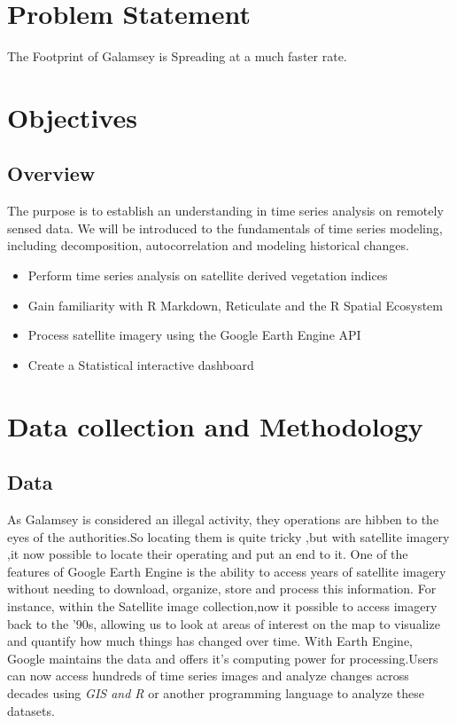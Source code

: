 \documentclass[12pt,a4paper]{article}
\begin{document}
	\section{Problem Statement}
	The Footprint of Galamsey is Spreading at a much faster rate.
	\section{Objectives}
	\subsection{Overview}
	The purpose  is to establish an understanding in time series analysis on remotely sensed data. We will be introduced to the fundamentals of time series modeling, including decomposition, autocorrelation and modeling historical changes.\\
    \begin{itemize}
    \item  Perform time series analysis on satellite derived vegetation indices\\
	\item Gain familiarity with R Markdown, Reticulate and the R Spatial Ecosystem\\
	\item  Process satellite imagery using the Google Earth Engine API\\
	\item  Create a Statistical  interactive dashboard\
    \end{itemize}
	

	\section{Data collection and Methodology}
	 \subsection{Data}As Galamsey is considered an illegal activity, they operations are hibben to the eyes of the authorities.So locating them is quite tricky ,but with satellite imagery ,it now possible to locate their operating and put an end to it. One of the  features of Google Earth Engine is the ability to access years of  satellite imagery without  needing to download, organize, store and process this information. For instance, within the Satellite  image collection,now it possible to access imagery back to the  '90s, allowing us to look at areas of interest on the map to visualize and quantify how much things has changed over time. With Earth Engine, Google maintains the data and offers it's computing power for processing.Users can now access hundreds of time series images and analyze changes across decades using \emph{GIS and R} or another programming language to analyze  these datasets.\\
\end{document}
